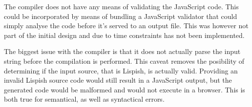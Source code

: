 The compiler does not have any means of validating the JavaScript code. This could be incorporated by means of bundling a JavaScript validator that could simply analyse the code before it's served to an output file. This was however not part of the initial design and due to time constraints has not been implemented.

The biggest issue with the compiler is that it does not actually parse the input string before the compilation is performed. This caveat removes the posibility of determining if the input source, that is Lispish, is actually valid. 
Providing an invalid Lispish source code would still result in a JavaScript output, but the generated code would be malformed and would not execute in a browser. This is both true for semantical, as well as syntactical errors.